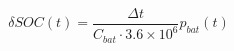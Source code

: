 \begin{equation}
	\delta SOC(t) = \frac{\Delta t}{C_{bat}\cdot3.6\times10^6}p_{bat}(t)
	\label{ch2:equ:soc-equation-from-battery-power}
\end{equation}